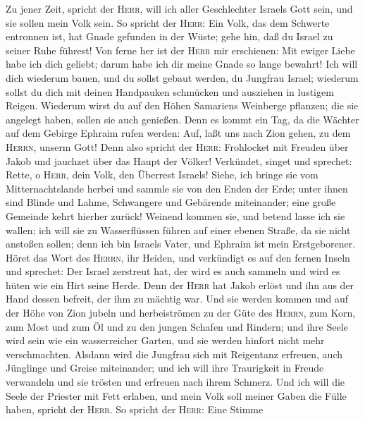  Zu jener Zeit, spricht der \textsc{Herr}, will ich aller
Geschlechter Israels Gott sein, und sie sollen mein Volk sein.
 So spricht der \textsc{Herr}: Ein Volk, das dem Schwerte
entronnen ist, hat Gnade gefunden in der Wüste; gehe hin, daß du Israel
zu seiner Ruhe führest!  Von ferne her ist der
\textsc{Herr} mir erschienen: Mit ewiger Liebe habe ich dich geliebt;
darum habe ich dir meine Gnade so lange bewahrt!  Ich will
dich wiederum bauen, und du sollst gebaut werden, du Jungfrau Israel;
wiederum sollst du dich mit deinen Handpauken schmücken und ausziehen in
lustigem Reigen.  Wiederum wirst du auf den Höhen
Samariens Weinberge pflanzen; die sie angelegt haben, sollen sie auch
genießen.  Denn es kommt ein Tag, da die Wächter auf dem
Gebirge Ephraim rufen werden: Auf, laßt uns nach Zion gehen, zu dem
\textsc{Herrn}, unserm Gott!  Denn also spricht der
\textsc{Herr}: Frohlocket mit Freuden über Jakob und jauchzet über das
Haupt der Völker! Verkündet, singet und sprechet: Rette, o
\textsc{Herr}, dein Volk, den Überrest Israels!  Siehe,
ich bringe sie vom Mitternachtslande herbei und sammle sie von den Enden
der Erde; unter ihnen sind Blinde und Lahme, Schwangere und Gebärende
miteinander; eine große Gemeinde kehrt hierher zurück! 
Weinend kommen sie, und betend lasse ich sie wallen; ich will sie zu
Wasserflüssen führen auf einer ebenen Straße, da sie nicht anstoßen
sollen; denn ich bin Israels Vater, und Ephraim ist mein Erstgeborener.
 Höret das Wort des \textsc{Herrn}, ihr Heiden, und
verkündigt es auf den fernen Inseln und sprechet: Der Israel zerstreut
hat, der wird es auch sammeln und wird es hüten wie ein Hirt seine
Herde.  Denn der \textsc{Herr} hat Jakob erlöst und ihn
aus der Hand dessen befreit, der ihm zu mächtig war.  Und
sie werden kommen und auf der Höhe von Zion jubeln und herbeiströmen zu
der Güte des \textsc{Herrn}, zum Korn, zum Most und zum Öl und zu den
jungen Schafen und Rindern; und ihre Seele wird sein wie ein
wasserreicher Garten, und sie werden hinfort nicht mehr verschmachten.
 Alsdann wird die Jungfrau sich mit Reigentanz erfreuen,
auch Jünglinge und Greise miteinander; und ich will ihre Traurigkeit in
Freude verwandeln und sie trösten und erfreuen nach ihrem Schmerz.
 Und ich will die Seele der Priester mit Fett erlaben,
und mein Volk soll meiner Gaben die Fülle haben, spricht der
\textsc{Herr}.  So spricht der \textsc{Herr}: Eine Stimme
